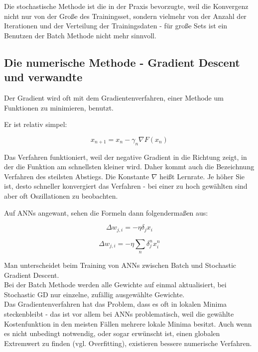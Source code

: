 Die stochastische Methode ist die in der Praxis bevorzugte, weil die Konvergenz nicht nur von der Große des Trainingsset, sondern vielmehr von der Anzahl der Iterationen und der Verteilung der Trainingsdaten - für große Sets ist ein Benutzen der Batch Methode nicht mehr sinnvoll. \cite{bengio2012practical}  


\subsection{Die numerische Methode - Gradient Descent und verwandte}

Der Gradient wird oft mit dem Gradientenverfahren, einer Methode um Funktionen zu minimieren, benutzt.

Er ist relativ simpel:

\begin{equation}
x_{n+1}=x_n-\gamma_n \nabla F(x_n)
\end{equation}

Das Verfahren funktioniert, weil der negative Gradient in die Richtung zeigt, in der die Funktion am schnellsten kleiner wird. Daher kommt auch die Bezeichnung Verfahren des steilsten Abstiegs.
Die Konstante $\nabla$ heißt Lernrate. Je höher Sie ist, desto schneller konvergiert das Verfahren - bei einer zu hoch gewählten sind aber oft Oszillationen zu beobachten. 

Auf ANNs angewant, sehen die Formeln dann folgendermaßen aus:

\begin{equation}
\Delta w_{j,i} = - \eta  \delta_j  x_i 
\end{equation}

\begin{equation}
\Delta w_{j,i} = - \eta  \sum_n \delta_j^n  x_i^n 
\end{equation}

\cite{bishop1995neural} 

Man unterscheidet beim Training von ANNs zwischen Batch und Stochastic Gradient Descent.\\

Bei der Batch Methode werden alle Gewichte auf einmal aktualisiert, bei Stochastic GD nur einzelne, zufällig ausgewählte Gewichte.\\

Das Gradientenverfahren hat das Problem, dass es oft in lokalen Minima steckenbleibt - das ist vor allem bei ANNs problematisch, weil die gewählte Kostenfunktion in den meisten Fällen mehrere lokale Minima besitzt. Auch wenn es nicht unbedingt notwendig, oder sogar erwünscht ist, einen globalen Extremwert zu finden (vgl. Overfitting), existieren bessere numerische Verfahren. \\

